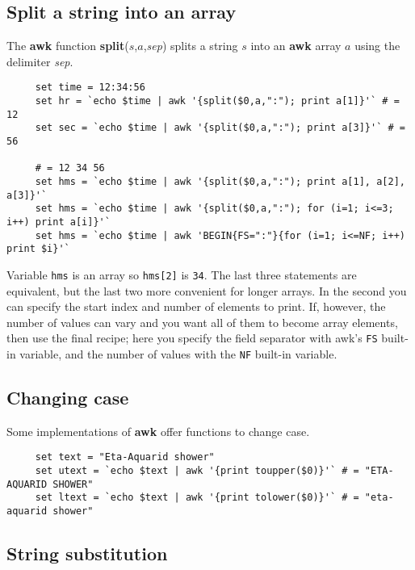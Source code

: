 \subsection{Split a string into an
array\label{sc4_se_string_split}}

The {\bf awk} function {\bf split}($s$,$a$,{\em sep}) splits a string
$s$ into an {\bf awk} array $a$ using the delimiter {\em sep}.

\small
\begin{verbatim}
     set time = 12:34:56
     set hr = `echo $time | awk '{split($0,a,":"); print a[1]}'` # = 12
     set sec = `echo $time | awk '{split($0,a,":"); print a[3]}'` # = 56

     # = 12 34 56
     set hms = `echo $time | awk '{split($0,a,":"); print a[1], a[2], a[3]}'`
     set hms = `echo $time | awk '{split($0,a,":"); for (i=1; i<=3; i++) print a[i]}'`
     set hms = `echo $time | awk 'BEGIN{FS=":"}{for (i=1; i<=NF; i++) print $i}'`
\end{verbatim}
\normalsize
Variable {\tt hms} is an array so {\tt hms[2]} is {\tt 34}.
The last three statements are equivalent, but the last two more
convenient for longer arrays.  In the second you can specify the start
index and number of elements to print.  If, however, the number of
values can vary and you want all of them to become array elements,
then use the final recipe; here you specify the field separator with
awk's {\tt FS} built-in variable, and the number of values with the
{\tt NF} built-in variable.

\subsection{Changing case
\label{sc4_se_string_case}}

Some implementations of {\bf awk} offer functions to change case.

\small
\begin{verbatim}
     set text = "Eta-Aquarid shower"
     set utext = `echo $text | awk '{print toupper($0)}'` # = "ETA-AQUARID SHOWER"
     set ltext = `echo $text | awk '{print tolower($0)}'` # = "eta-aquarid shower"
\end{verbatim}
\normalsize


\subsection{String substitution
\label{sc4_se_string_sub}}

